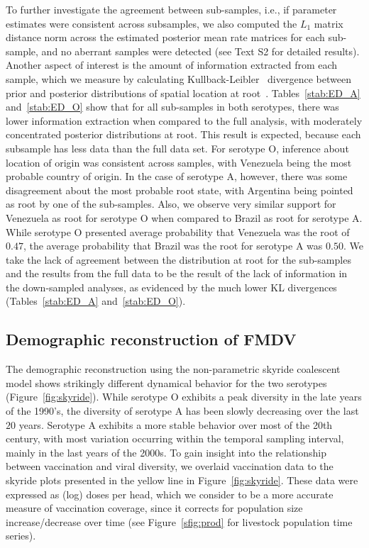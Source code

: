 \documentclass[10pt]{article}
\begin{document}
To further investigate the agreement between sub-samples, i.e., if parameter estimates were consistent across subsamples, we also computed the $L_1$ matrix distance norm across the estimated posterior mean rate matrices for each sub-sample, and no aberrant samples were detected (see Text S2 for detailed results).
Another aspect of interest is the amount of information extracted from each sample, which we measure by calculating Kullback-Leibler~\cite{KL} divergence between prior and posterior distributions of spatial location at root~\cite{roots}.
Tables~\ref{stab:ED_A} and~\ref{stab:ED_O} show that for all sub-samples in both serotypes, there was lower information extraction when compared to the full analysis, with moderately concentrated posterior distributions at root.
This result is expected, because each subsample has less data than the full data set.
For serotype O, inference about location of origin was consistent across samples, with Venezuela being the most probable country of origin.
In the case of serotype A, however, there was some disagreement about the most probable root state, with Argentina being pointed as root by one of the sub-samples.
Also, we observe very similar support for Venezuela as root for serotype O when compared to Brazil as root for serotype A.
While serotype O presented average probability that Venezuela was the root of $0.47$, the average probability that Brazil was the root for serotype A was $0.50$.
We take the lack of agreement between the distribution at root for the sub-samples and the results from the full data to be the result of the lack of information in the down-sampled analyses, as evidenced by the much lower KL divergences (Tables~\ref{stab:ED_A} and~\ref{stab:ED_O}). 

\subsection*{Demographic reconstruction of FMDV}

The demographic reconstruction using the non-parametric skyride coalescent model shows strikingly different dynamical behavior for the two serotypes (Figure~\ref{fig:skyride}).
While serotype O exhibits a peak diversity in the late years of the 1990's, the diversity of serotype A has been slowly decreasing over the last $20$ years.
Serotype A exhibits a more stable behavior over most of the 20th century, with most variation occurring within the temporal sampling interval, mainly in the last years of the 2000s.
To gain insight into the relationship between vaccination and viral diversity, we overlaid vaccination data to the skyride plots presented in the yellow line in Figure~\ref{fig:skyride}.
These data were expressed as (log) doses per head, which we consider to be a more accurate measure of vaccination coverage, since it corrects for population size increase/decrease over time (see Figure~\ref{sfig:prod} for livestock population time series). 
\end{document}
